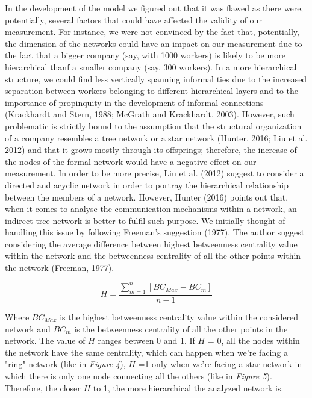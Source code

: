 \documentclass{article}
\begin{document}
In the development of the model we figured out that it was flawed as there were, potentially, several factors that could have affected the validity of our measurement. For instance, we were not convinced by the fact that, potentially, the dimension of the networks could have an impact on our measurement due to the fact that a bigger company (say, with 1000 workers) is likely to be more hierarchical thanf a smaller company (say, 300 workers). In a more hierarchical structure, we could find less vertically spanning informal ties due to the increased separation between workers belonging to different hierarchical layers and to the importance of propinquity in the development of informal connections (Krackhardt and Stern, 1988; McGrath and Krackhardt, 2003). However, such problematic is strictly bound to the assumption that the structural organization of a company resembles a tree network or a star network (Hunter, 2016; Liu et al. 2012) and that it grows mostly through its offsprings; therefore, the increase of the nodes of the formal network would have a negative effect on our measurement. In order to be more precise, Liu et al. (2012) suggest to consider a directed and acyclic network in order to portray the hierarchical relationship between the members of a network. However, Hunter (2016) points out that, when it comes to analyse the communication mechanisms within a network, an indirect tree network is better to fulfil such purpose.
We initially thought of handling this issue by following Freeman's suggestion (1977). The author suggest considering the average difference between highest betweenness centrality value within the network and the betweenness centrality of all the other points within the network (Freeman, 1977).

\begin{equation}
H=\frac{\sum_{m=1}^{n}\left[{BC}_{Max}-{BC}_m\right]}{n-1}
\end{equation}

Where $BC_{Max}$ is the highest betweenness centrality value within the considered network and $BC_m$ is the betweenness centrality of all the other points in the network. The value of $H$ ranges between 0 and 1. If $H$ = 0, all the nodes within the network have the same centrality, which can happen when we're facing a "ring" network (like in \emph{Figure 4}), $H$ =1 only when we’re facing a star network in which there is only one node connecting all the others (like in \emph{Figure 5}). Therefore, the closer $H$ to 1, the more hierarchical the analyzed network is.
\end{document}
